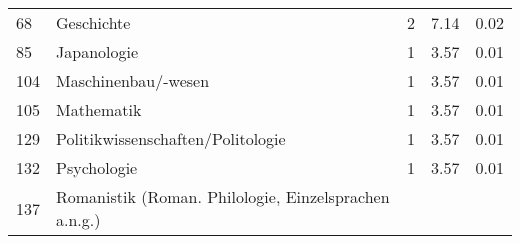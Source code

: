 \begin{longtable}{lXrrr}
     68 &
     \multicolumn{1}{X}{ Geschichte   } &


       \num{2} &
       \num[round-mode=places,round-precision=2]{7.14} &
         \num[round-mode=places,round-precision=2]{0.02} \\

     85 &
     \multicolumn{1}{X}{ Japanologie   } &


       \num{1} &
       \num[round-mode=places,round-precision=2]{3.57} &
         \num[round-mode=places,round-precision=2]{0.01} \\

     104 &
     \multicolumn{1}{X}{ Maschinenbau/-wesen   } &


       \num{1} &
       \num[round-mode=places,round-precision=2]{3.57} &
         \num[round-mode=places,round-precision=2]{0.01} \\

     105 &
     \multicolumn{1}{X}{ Mathematik   } &


       \num{1} &
       \num[round-mode=places,round-precision=2]{3.57} &
         \num[round-mode=places,round-precision=2]{0.01} \\

     129 &
     \multicolumn{1}{X}{ Politikwissenschaften/Politologie   } &


       \num{1} &
       \num[round-mode=places,round-precision=2]{3.57} &
         \num[round-mode=places,round-precision=2]{0.01} \\

     132 &
     \multicolumn{1}{X}{ Psychologie   } &


       \num{1} &
       \num[round-mode=places,round-precision=2]{3.57} &
         \num[round-mode=places,round-precision=2]{0.01} \\

     137 &
     \multicolumn{1}{X}{ Romanistik (Roman. Philologie, Einzelsprachen a.n.g.)   } &



\end{longtable}
